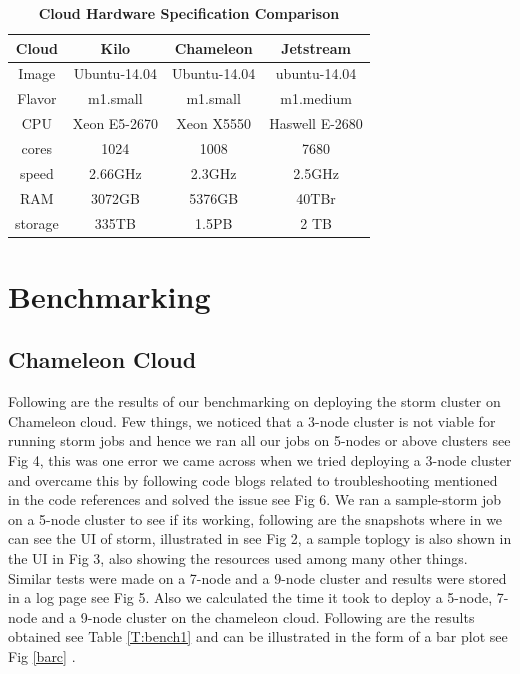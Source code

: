 \documentclass[9pt,twocolumn,twoside]{../../styles/osajnl}
\begin{document}
\begin{table}[h!]
\centering
\caption{\bf Cloud Hardware Specification Comparison }

\begin{tabular} {|c||c||c||c|}
\hline Cloud & Kilo & Chameleon & Jetstream \\ [0.5ex] \hline Image &
Ubuntu-14.04 & Ubuntu-14.04 &
ubuntu-14.04 \\
\hline Flavor &m1.small &m1.small & m1.medium \\ \hline CPU & Xeon E5-2670 & Xeon X5550 &
Haswell E-2680 \\ \hline cores & 1024 & 1008 & 7680 \\ \hline speed &
2.66GHz & 2.3GHz & 2.5GHz\\ \hline RAM & 3072GB & 5376GB &
40TBr\\ \hline storage & 335TB & 1.5PB & 2 TB\\ [1ex] \hline
\end{tabular}
  \label{tab:cloud-comparison}
\end{table}



\section{Benchmarking}
\subsection{Chameleon Cloud}
Following are the results of our benchmarking on deploying the storm
cluster on Chameleon cloud. Few things, we noticed that a 3-node
cluster is not viable for running storm jobs and hence we ran all our
jobs on 5-nodes or above clusters see Fig 4, this was one error we
came across when we tried deploying a 3-node cluster and overcame this
by following code blogs related to troubleshooting mentioned in the
code references and solved the issue see Fig 6. We ran a sample-storm
job on a 5-node cluster to see if its working, following are the
snapshots where in we can see the UI of storm, illustrated in see Fig
2, a sample toplogy is also shown in the UI in Fig 3, also showing the
resources used among many other things. Similar tests were made on a
7-node and a 9-node cluster and results were stored in a log page see
Fig 5.  Also we calculated the time it took to deploy a 5-node, 7-node
and a 9-node cluster on the chameleon cloud. Following are the results
obtained see Table \ref{T:bench1} and can be illustrated in the form of a bar plot see Fig \ref{barc} .
\end{document}
